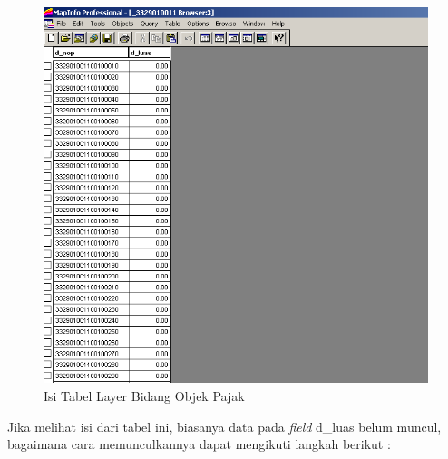 \begin{enumerate}[1.]
  \begin{figure}[H]
    \centering
    \includegraphics[width=1\textwidth]{./resources/066-isi-tabel-bidang}
    \caption{Isi Tabel Layer Bidang Objek Pajak}
  \end{figure}
\end{enumerate}

Jika melihat isi dari tabel ini, biasanya data pada \textit{field} d\_luas belum muncul, bagaimana cara memunculkannya dapat mengikuti langkah berikut :

